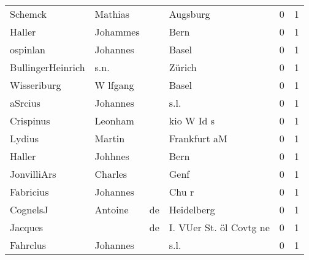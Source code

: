 \begin{center}
\begin{tiny}
\begin{longtabu}{llllrr}
                  Schemck &                            Mathias &             &                                    Augsburg &          0 &         1 \\
                   Haller &                           Johammes &             &                                        Bern &          0 &         1 \\
                 ospinlan &                           Johannes &             &                                       Basel &          0 &         1 \\
        BullingerHeinrich &                               s.n. &             &                                      Zürich &          0 &         1 \\
              Wisseriburg &                           W lfgang &             &                                       Basel &          0 &         1 \\
                  aSrcius &                           Johannes &             &                                        s.l. &          0 &         1 \\
                Crispinus &                            Leonham &             &                                  kio W Id s &          0 &         1 \\
                   Lydius &                             Martin &             &                                Frankfurt aM &          0 &         1 \\
                   Haller &                            Johhnes &             &                                        Bern &          0 &         1 \\
              JonvilliArs &                            Charles &             &                                        Genf &          0 &         1 \\
                Fabricius &                           Johannes &             &                                       Chu r &          0 &         1 \\
                 CognelsJ &                            Antoine &          de &                                  Heidelberg &          0 &         1 \\
                  Jacques &                                    &          de &                     I. VUer St. öl Covtg ne &          0 &         1 \\
                 Fahrclus &                           Johannes &             &                                        s.l. &          0 &         1 \\

\end{longtabu}
\end{tiny}
\end{center}
